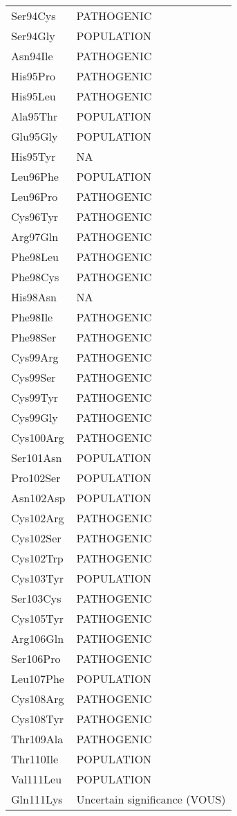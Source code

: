 \begin{longtable}[l]{l|l}
	Ser94Cys & PATHOGENIC \\
	Ser94Gly & POPULATION \\
	Asn94Ile & PATHOGENIC \\
	His95Pro & PATHOGENIC \\
	His95Leu & PATHOGENIC \\
	Ala95Thr & POPULATION \\
	Glu95Gly & POPULATION \\
	His95Tyr & NA \\
	Leu96Phe & POPULATION \\
	Leu96Pro & PATHOGENIC \\
	Cys96Tyr & PATHOGENIC \\
	Arg97Gln & PATHOGENIC \\
	Phe98Leu & PATHOGENIC \\
	Phe98Cys & PATHOGENIC \\
	His98Asn & NA \\
	Phe98Ile & PATHOGENIC \\
	Phe98Ser & PATHOGENIC \\
	Cys99Arg & PATHOGENIC \\
	Cys99Ser & PATHOGENIC \\
	Cys99Tyr & PATHOGENIC \\
	Cys99Gly & PATHOGENIC \\
	Cys100Arg & PATHOGENIC \\
	Ser101Asn & POPULATION \\
	Pro102Ser & POPULATION \\
	Asn102Asp & POPULATION \\
	Cys102Arg & PATHOGENIC \\
	Cys102Ser & PATHOGENIC \\
	Cys102Trp & PATHOGENIC \\
	Cys103Tyr & POPULATION \\
	Ser103Cys & PATHOGENIC \\
	Cys105Tyr & PATHOGENIC \\
	Arg106Gln & PATHOGENIC \\
	Ser106Pro & PATHOGENIC \\
	Leu107Phe & POPULATION \\
	Cys108Arg & PATHOGENIC \\
	Cys108Tyr & PATHOGENIC \\
	Thr109Ala & PATHOGENIC \\
	Thr110Ile & POPULATION \\
	Val111Leu & POPULATION \\
	Gln111Lys & Uncertain significance (VOUS) \\

\end{longtable}
